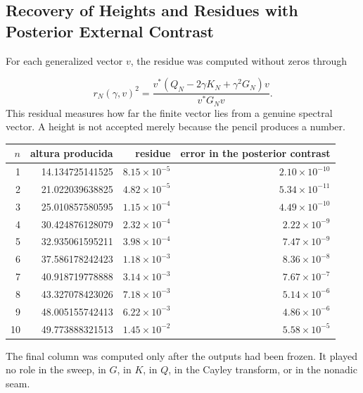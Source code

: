 \subsection{Recovery of Heights and Residues with Posterior External Contrast}
For each generalized vector \(v\), the residue was computed without zeros through\par
\[
r_N(\gamma,v)^2
=
\frac{
v^*
\left(
Q_N-2\gamma K_N+\gamma^2G_N
\right)v
}{
v^*G_Nv
}.
\]
This residual measures how far the finite vector lies from a genuine spectral vector. A height is not accepted merely because the pencil produces a number.\par
{}
\begin{center}
\small
\begin{tabularx}{\textwidth}{@{}RRRR@{}}
\toprule
\(n\) & altura producida & residue & error in the posterior contrast \\
 & 14.134725141525 & \(8.15\times10^{-5}\) & \(2.10\times10^{-10}\) \\
2 & 21.022039638825 & \(4.82\times10^{-5}\) & \(5.34\times10^{-11}\) \\
3 & 25.010857580595 & \(1.15\times10^{-4}\) & \(4.49\times10^{-10}\) \\
4 & 30.424876128079 & \(2.32\times10^{-4}\) & \(2.22\times10^{-9}\) \\
5 & 32.935061595211 & \(3.98\times10^{-4}\) & \(7.47\times10^{-9}\) \\
6 & 37.586178242423 & \(1.18\times10^{-3}\) & \(8.36\times10^{-8}\) \\
7 & 40.918719778888 & \(3.14\times10^{-3}\) & \(7.67\times10^{-7}\) \\
8 & 43.327078423026 & \(7.18\times10^{-3}\) & \(5.14\times10^{-6}\) \\
9 & 48.005155742413 & \(6.22\times10^{-3}\) & \(4.86\times10^{-6}\) \\
10 & 49.773888321513 & \(1.45\times10^{-2}\) & \(5.58\times10^{-5}\) \\
\bottomrule
\end{tabularx}
\end{center}
The final column was computed only after the outputs had been frozen. It played no role in the sweep, in \(G\), in \(K\), in \(Q\), in the Cayley transform, or in the nonadic seam.\par
{}
